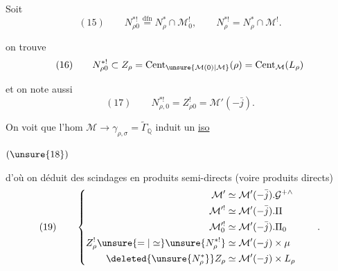 
Soit
\[
(15)\qquad
N_{\rho0}^{*!}\overset{\mathrm{dfn}}=N_\rho^*\cap\mathcal M_0^!,
\qquad N_\rho^{*!}=N_\rho^*\cap\mathcal M^!.
\]

on trouve
\[
(16)\qquad
N_{\rho0}^{*!}\subset Z_\rho
=\operatorname{Cent}_{\unsure{\mathcal M(0)|\mathcal M}}(\rho)
=\operatorname{Cent}_{\mathcal M}(L_\rho)
\]

et on note aussi
\[
(17)\qquad N_{\rho,0}^{*!}=Z_{\rho0}^{!}=\mathcal M'(-\bar j).
\]

On voit que l'hom $\mathcal M\to\gamma_{\rho,\sigma}
=\widetilde{\Gamma}_{\mathbb Q}$ induit un \uline{iso}

\( (\unsure{18}) \)\quad
{}

d'où on déduit des scindages en produits semi-directs
(voire produits directs)
\[
(19)\qquad
\left\{\begin{aligned}
\mathcal M'&\simeq\mathcal M'(-\bar j).\mathcal G^{+\wedge}\\
\mathcal M^{\prime!}&\simeq\mathcal M'(-\bar j).\Pi\\
\mathcal M_0^{\prime!}&\simeq\mathcal M'(-\bar j).\Pi_0\\
Z_\rho^!\unsure{=|\simeq}\unsure{N_\rho^{*!}}
  &\simeq\mathcal M'(-j)\times\mu\\
\deleted{\unsure{N_\rho^*}}Z_\rho
  &\simeq\mathcal M'(-j)\times L_\rho
\end{aligned}\right.\qquad .
\]


\quad
{}
